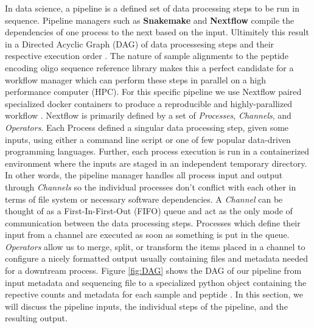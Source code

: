 \documentclass{article}
\begin{document}
In data science, a pipeline is a defined set of data processing steps to be run in sequence. 
Pipeline managers such as \textbf{Snakemake} and \textbf{Nextflow} compile the dependencies of one process to the next based on the input. 
Ultimitely this result in a Directed Acyclic Graph (DAG) of data processesing steps and their respective execution order \cite{Merkel_2017, Koster2012}. 
The nature of sample alignments to the peptide encoding oligo sequence reference library makes this a perfect candidate for a workflow manager which can perform these steps in parallel on a high performance computer (HPC). 
For this specific pipeline we use Nextflow paired specialized docker containers to produce a reproducible and highly-parallized workflow \cite{Merkel_2017, DiTommaso2017}.
Nextflow is primarily defined by a set of \textit{Processes}, \textit{Channels}, and \textit{Operators}.
Each Process defined a singular data processing step, given some inputs, using either a command line script or one of few popular data-driven programming languages.
Further, each process execution is run in a containerized environment where the inputs are staged in an independent temporary directory.
In other words, the pipeline manager handles all process input and output through \textit{Channels} so the individual processes don't conflict with each other in terms of file system or necessary software dependencies.
A \textit{Channel} can be thought of as a First-In-First-Out (FIFO) queue and act as the only mode of communication between the data processing steps.
Processes which define their input from a channel are executed as soon as something is put in the queue.
\textit{Operators} allow us to merge, split, or transform the items placed in a channel to configure a nicely formatted output usually containing files and metadata
needed for a downtream process.
Figure \ref{fig:DAG} shows the DAG of our pipeline from input metadata and sequencing file to a specialized python object containing
the repective counts and metadata for each sample and peptide \cite{van1995python}.
In this section, we will discuss the pipeline inputs, the individual steps of the pipeline, and the resulting output.
\end{document}
